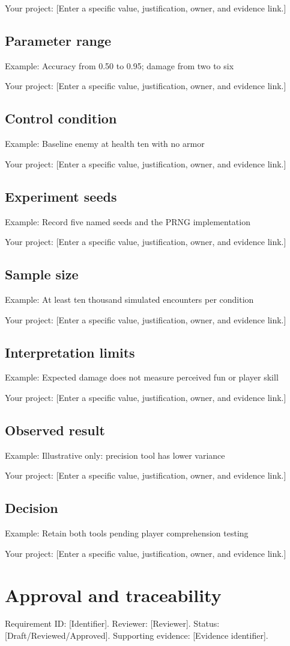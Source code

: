 \documentclass[11pt]{article}
\begin{document}
Your project: [Enter a specific value, justification, owner, and evidence link.]


\subsection{Parameter range}
Example: Accuracy from 0.50 to 0.95; damage from two to six

Your project: [Enter a specific value, justification, owner, and evidence link.]


\subsection{Control condition}
Example: Baseline enemy at health ten with no armor

Your project: [Enter a specific value, justification, owner, and evidence link.]


\subsection{Experiment seeds}
Example: Record five named seeds and the PRNG implementation

Your project: [Enter a specific value, justification, owner, and evidence link.]


\subsection{Sample size}
Example: At least ten thousand simulated encounters per condition

Your project: [Enter a specific value, justification, owner, and evidence link.]


\subsection{Interpretation limits}
Example: Expected damage does not measure perceived fun or player skill

Your project: [Enter a specific value, justification, owner, and evidence link.]


\subsection{Observed result}
Example: Illustrative only: precision tool has lower variance

Your project: [Enter a specific value, justification, owner, and evidence link.]


\subsection{Decision}
Example: Retain both tools pending player comprehension testing

Your project: [Enter a specific value, justification, owner, and evidence link.]


\section{Approval and traceability}
Requirement ID: [Identifier]. Reviewer: [Reviewer]. Status: [Draft/Reviewed/Approved]. Supporting evidence: [Evidence identifier].
\end{document}
